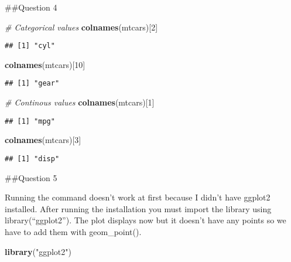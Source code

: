 \documentclass[
]{article}
\newenvironment{Shaded}{\begin{snugshade}}{\end{snugshade}}
\newcommand{\CommentTok}[1]{\textcolor[rgb]{0.56,0.35,0.01}{\textit{#1}}}
\newcommand{\DecValTok}[1]{\textcolor[rgb]{0.00,0.00,0.81}{#1}}
\newcommand{\FunctionTok}[1]{\textcolor[rgb]{0.13,0.29,0.53}{\textbf{#1}}}
\newcommand{\NormalTok}[1]{#1}
\newcommand{\StringTok}[1]{\textcolor[rgb]{0.31,0.60,0.02}{#1}}
\begin{document}
\#\#Question 4

\begin{Shaded}
\begin{Highlighting}[]
\CommentTok{\# Categorical values}
\FunctionTok{colnames}\NormalTok{(mtcars)[}\DecValTok{2}\NormalTok{]}
\end{Highlighting}
\end{Shaded}

\begin{verbatim}
## [1] "cyl"
\end{verbatim}

\begin{Shaded}
\begin{Highlighting}[]
\FunctionTok{colnames}\NormalTok{(mtcars)[}\DecValTok{10}\NormalTok{]}
\end{Highlighting}
\end{Shaded}

\begin{verbatim}
## [1] "gear"
\end{verbatim}

\begin{Shaded}
\begin{Highlighting}[]
\CommentTok{\# Continous values}
\FunctionTok{colnames}\NormalTok{(mtcars)[}\DecValTok{1}\NormalTok{]}
\end{Highlighting}
\end{Shaded}

\begin{verbatim}
## [1] "mpg"
\end{verbatim}

\begin{Shaded}
\begin{Highlighting}[]
\FunctionTok{colnames}\NormalTok{(mtcars)[}\DecValTok{3}\NormalTok{]}
\end{Highlighting}
\end{Shaded}

\begin{verbatim}
## [1] "disp"
\end{verbatim}

\#\#Question 5

Running the command doesn't work at first because I didn't have ggplot2
installed. After running the installation you must import the library
using library(``ggplot2''). The plot displays now but it doesn't have
any points so we have to add them with geom\_point().

\begin{Shaded}
\begin{Highlighting}[]
\FunctionTok{library}\NormalTok{(}\StringTok{"ggplot2"}\NormalTok{)}
\end{Highlighting}
\end{Shaded}
\end{document}
